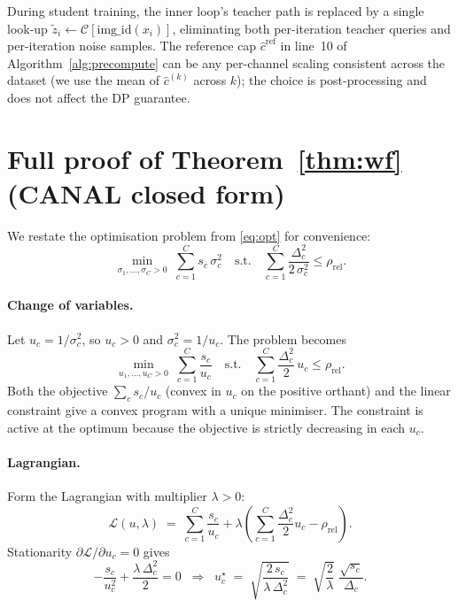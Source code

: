 \noindent During student training, the inner loop's teacher path is
replaced by a single look-up $\widetilde{z}_i \leftarrow
\mathcal{C}[\mathrm{img\_id}(x_i)]$, eliminating both per-iteration
teacher queries and per-iteration noise samples. The reference cap
$\widehat{c}^{\mathrm{ref}}$ in line~10 of
Algorithm~\ref{alg:precompute} can be any per-channel scaling
consistent across the dataset (we use the mean of $\widehat{c}^{(k)}$
across $k$); the choice is post-processing and does not affect the
DP guarantee.

\section{Full proof of Theorem~\ref{thm:wf} (CANAL closed form)}
\label{app:proof}

We restate the optimisation problem from \eqref{eq:opt} for
convenience:
\begin{equation*}
\min_{\sigma_1,\ldots,\sigma_C>0}\; \sum_{c=1}^{C} s_c\,\sigma_c^{2}
\quad\text{s.t.}\quad
\sum_{c=1}^{C} \frac{\Delta_c^{2}}{2\,\sigma_c^{2}} \le \rho_{\mathrm{rel}}.
\end{equation*}

\paragraph{Change of variables.}
Let $u_c = 1/\sigma_c^{2}$, so $u_c > 0$ and $\sigma_c^{2} = 1/u_c$.
The problem becomes
\begin{equation}
\min_{u_1,\ldots,u_C>0}\; \sum_{c=1}^{C} \frac{s_c}{u_c}
\quad\text{s.t.}\quad
\sum_{c=1}^{C} \frac{\Delta_c^{2}}{2}\,u_c \le \rho_{\mathrm{rel}}.
\label{eq:dual}
\end{equation}
Both the objective $\sum_c s_c/u_c$ (convex in $u_c$ on the positive
orthant) and the linear constraint give a convex program with a
unique minimiser. The constraint is active at the optimum because the
objective is strictly decreasing in each $u_c$.

\paragraph{Lagrangian.}
Form the Lagrangian with multiplier $\lambda > 0$:
\begin{equation*}
\mathcal{L}(u,\lambda)
 \;=\; \sum_{c=1}^{C} \frac{s_c}{u_c}
       + \lambda\left(\sum_{c=1}^{C}\frac{\Delta_c^{2}}{2}u_c - \rho_{\mathrm{rel}}\right).
\end{equation*}
Stationarity $\partial\mathcal{L}/\partial u_c = 0$ gives
\begin{equation*}
-\frac{s_c}{u_c^{2}} + \frac{\lambda\,\Delta_c^{2}}{2} = 0
\;\;\Longrightarrow\;\;
u_c^{\star} \;=\; \sqrt{\frac{2\,s_c}{\lambda\,\Delta_c^{2}}}
\;=\; \sqrt{\frac{2}{\lambda}}\;\frac{\sqrt{s_c}}{\Delta_c}.
\end{equation*}

